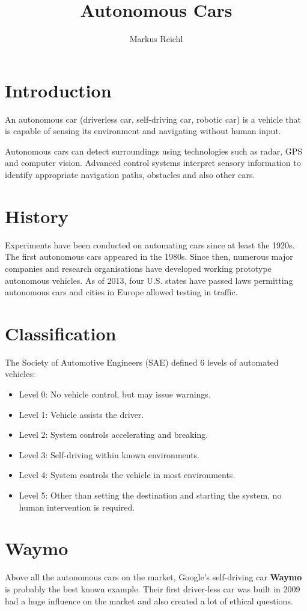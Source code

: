 \documentclass[a4paper,11pt]{article}
\title{Autonomous Cars}
\author{Markus Reichl}
\begin{document}
\maketitle

\section{Introduction}
An autonomous car (driverless car, self-driving car, robotic car) is a vehicle that is capable of sensing its environment and navigating without human input.

Autonomous cars can detect surroundings using technologies such as radar, GPS and computer vision. 
Advanced control systems interpret sensory information to identify appropriate navigation paths, obstacles and also other cars.

\section{History}
Experiments have been conducted on automating cars since at least the 1920s. 
The first autonomous cars appeared in the 1980s. 
Since then, numerous major companies and research organisations have developed working prototype autonomous vehicles.
As of 2013, four U.S. states have passed laws permitting autonomous cars and cities in Europe allowed testing in traffic.

\section{Classification}
The Society of Automotive Engineers (SAE) defined 6 levels of automated vehicles:
\begin{itemize}
 \item Level 0: No vehicle control, but may issue warnings.
 \item Level 1: Vehicle assists the driver.
 \item Level 2: System controls accelerating and breaking.
 \item Level 3: Self-driving within known environments.
 \item Level 4: System controls the vehicle in most environments.
 \item Level 5: Other than setting the destination and starting the system, no human intervention is required.
\end{itemize}

\section{Waymo}
Above all the autonomous cars on the market, Google's self-driving car \textbf{Waymo} is probably the best known example.
Their first driver-less car was built in 2009 had a huge influence on the market and also created a lot of ethical questions.
\end{document}
